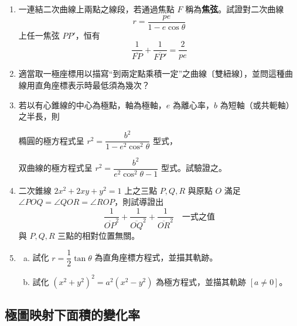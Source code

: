 \begin{enumerate}[1.]
  \item 一連結二次曲線上兩點之線段，若通過焦點 $F$ 稱為\textbf{焦弦}。試證對二次曲線
  \[
    r = \frac{pe}{1 - e\cos\theta}
  \]
  上任一焦弦 $PP'$，恒有
  \[
    \frac{1}{\overline{FP}} + \frac{1}{\overline{FP'}} = \frac{2}{pe}
  \]

  \item 適當取一極座標用以描寫“到兩定點乘積一定”之曲線〔雙紐線〕，並問這種曲線用直角座標表示時最低須為幾次？

  \item 若以有心錐線的中心為極點，軸為極軸，$e$ 為離心率，$b$ 為短軸（或共軛軸）之半長，則

  橢圓的極方程式呈 $r^2 = \dfrac{b^2}{1 - e^2\cos^2\theta}$ 型式，

  双曲線的極方程式呈 $r^2 = \dfrac{b^2}{e^2\cos^2\theta - 1}$ 型式。試驗證之。

  \item[*9.] 二次錐線 $2x^2 + 2xy + y^2 = 1$ 上之三點 $P, Q, R$ 與原點 $O$ 滿足 $\angle POQ = \angle QOR = \angle ROP$，則試導證出
  \[
    \frac{1}{\overline{OP}^2} + \frac{1}{\overline{OQ}^2} + \frac{1}{\overline{OR}^2} \quad \text{一式之值}
  \]
  與 $P, Q, R$ 三點的相對位置無關。

  \item[10.]
  \begin{enumerate}[(a)]
    \item 試化 $r = \dfrac{1}{2}\tan\theta$ 為直角座標方程式，並描其軌跡。
    \item 試化 $(x^2 + y^2)^2 = a^2(x^2 - y^2)$ 為極方程式，並描其軌跡 $[a \neq 0]$。
  \end{enumerate}
\end{enumerate}

\subsection{極圖映射下面積的變化率}
\label{sec:b5s-1-6}

